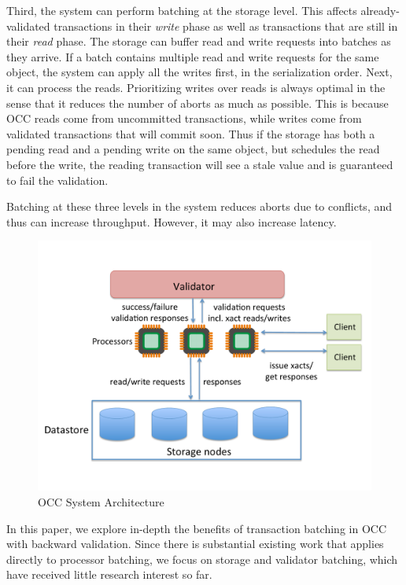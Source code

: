 Third, the system can perform batching at the storage level. This affects already-validated transactions in their \emph{write} phase as well as transactions that are still in their \emph{read} phase. The storage can buffer read and write requests into batches as they arrive. If a batch contains multiple read and write requests for the same object, the system can apply all the writes first, in the serialization order. Next, it can process the reads. Prioritizing writes over reads is always optimal in the sense that it reduces the number of aborts as much as possible. This is because OCC reads come from uncommitted transactions, while writes come from validated transactions that will commit soon. Thus if the storage has both a pending read and a pending write on the same object, but schedules the read before the write, the reading transaction will see a stale value and is guaranteed to fail the validation. 

Batching at these three levels in the system reduces aborts due to conflicts, and thus can increase throughput. However, it may also increase latency.

\begin{figure}[t]
 \centering
 \includegraphics[width=0.9\columnwidth]{figures/OCCArchitecture.pdf}
 \vspace{-.5em}
 \caption{OCC System Architecture}
 \label{fig:occ_arch}
\end{figure}


In this paper, we explore in-depth the benefits of transaction batching in OCC with backward validation. Since there is substantial existing work that applies directly to processor batching, we focus on storage and validator batching, which have received little research interest so far.

